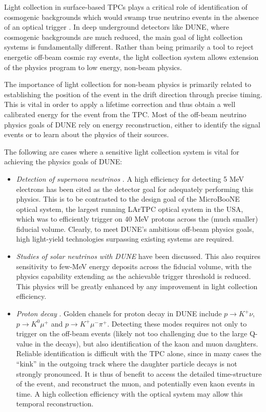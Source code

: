 
Light collection in surface-based TPCs plays a critical role of identification of cosmogenic backgrounds which would swamp true neutrino events in the absence of an optical trigger \cite{MicroBooNECosmic}. In deep underground detectors like DUNE, where cosmogenic backgrounds are much reduced, the main goal of light collection systems is fundamentally different. Rather than being primarily a tool to reject energetic off-beam cosmic ray events, the light collection system allows extension of the physics program to low energy, non-beam physics.

The importance of light collection for non-beam physics is primarily related to establishing the position of the event in the drift direction through precise timing.  This is vital in order to apply a lifetime correction and thus obtain a well calibrated energy for the event from the TPC.  Most of the off-beam neutrino physics goals of DUNE rely on energy reconstruction, either to identify the signal events or to learn about the physics of their sources.

The following are cases where a sensitive light collection system is vital for achieving the physics goals of DUNE:

\begin{itemize}
\item \emph{Detection of supernova neutrinos} \cite{Ankowski:2016lab}.  A high efficiency for detecting 5 MeV electrons has been cited as the detector goal for adequately performing this physics.  This is to be contrasted to the design goal of the MicroBooNE optical system, the largest running LArTPC optical system in the USA, which was to efficiently trigger on 40 MeV protons across the (much smaller) fiducial volume.  Clearly, to meet DUNE's ambitious off-beam physics goals, high light-yield technologies surpassing existing systems are required.
\item \emph{Studies of solar neutrinos with DUNE} \cite{Kudryavtsev:2016ybl} have been discussed. This also requires sensitivity to few-MeV energy deposits across the fiducial volume, with the physics capability extending as the achievable trigger threshold is reduced.  This physics will be greatly enhanced by any improvement in light collection efficiency.
\item \emph{Proton decay} \cite{Adams:2013qkq}.  Golden chanels for proton decay in DUNE include $p \rightarrow K^+ \nu$, $p \rightarrow K^0 \mu^+$ and $p \rightarrow K^+ \mu^- \pi^+$.  Detecting these modes requires not only to trigger on the off-beam events (likely not too challenging due to the large Q-value in the decays), but also identification of the kaon and muon daughters.  Reliable identification is difficult with the TPC alone, since in many cases the ``kink'' in the outgoing track where the daughter particle decays is not strongly pronounced.   It is thus of benefit to access the detailed time-structure of the event, and reconstruct the muon, and potentially even kaon events in time.  A high collection efficiency with the optical system may allow this temporal reconstruction.
\end{itemize}

